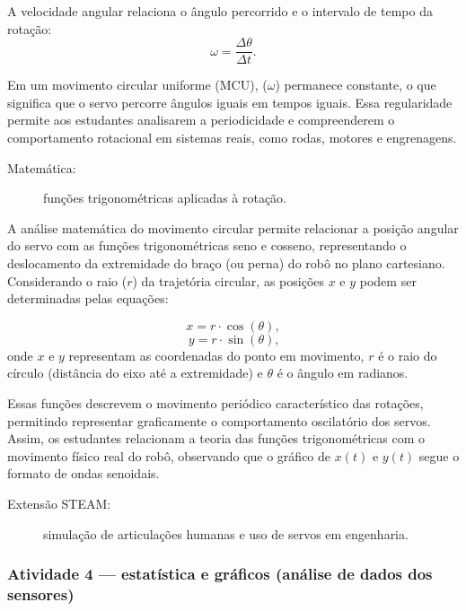 \documentclass[portuguese]{textolivre}
\begin{document}
A velocidade angular relaciona o ângulo percorrido e o intervalo de tempo da rotação:
\begin{equation}
	\omega = \frac{\Delta \theta}{\Delta t} .
\end{equation}

Em um movimento circular uniforme (MCU), ($\omega$) permanece constante, o que significa que o servo percorre ângulos iguais em tempos iguais. Essa regularidade permite aos estudantes analisarem a periodicidade e compreenderem o comportamento rotacional em sistemas reais, como rodas, motores e engrenagens.

\begin{description}
    \item[Matemática:] funções trigonométricas aplicadas à rotação.
\end{description}

A análise matemática do movimento circular permite relacionar a posição angular do servo com as funções trigonométricas seno e cosseno, representando o deslocamento da extremidade do braço (ou perna) do robô no plano cartesiano.
Considerando o raio ($r$) da trajetória circular, as posições $x$ e $y$ podem ser determinadas pelas equações:

\begin{equation}
	x = r \cdot \cos(\theta) ,
\end{equation}
\begin{equation}
	y = r \cdot \sin(\theta) \text{,}
\end{equation}
onde $x$ e $y$ representam as coordenadas do ponto em movimento,
$r$ é o raio do círculo (distância do eixo até a extremidade) e
$\theta$ é o ângulo em radianos.

Essas funções descrevem o movimento periódico característico das rotações, permitindo representar graficamente o comportamento oscilatório dos servos. Assim, os estudantes relacionam a teoria das funções trigonométricas com o movimento físico real do robô, observando que o gráfico de $x(t)$ e $y(t)$ segue o formato de ondas senoidais.

\begin{description}
    \item[Extensão STEAM:] simulação de articulações humanas e uso de servos em engenharia.
\end{description} 


\subsubsection{Atividade 4 — estatística e gráficos (análise de dados dos sensores)}
\end{document}
